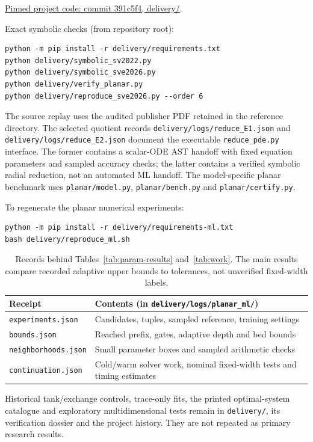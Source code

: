 \documentclass[12pt,a4paper,oneside]{report}
\numberwithin{equation}{chapter}
\theoremstyle{definition}
\theoremstyle{remark}\newtheorem{remark}[theorem]{Remark}
\DeclareRobustCommand{\code}[1]{\nolinkurl{#1}}
\newif\ifreviewmarks
\DeclareRobustCommand{\review}[1]{{\ifreviewmarks\color{authorblue}\fi #1}}
\begin{document}
\noindent\href{https://github.com/CarlXerophilem/Lie-ML_PDES/tree/391c5f4d0e5ea3a5341aab414ac1944e8e46f0c4/delivery}{\review{Pinned project code: commit 391c5f4, delivery/}}.

\smallskip\noindent Exact symbolic checks (from repository root):
\begin{verbatim}
python -m pip install -r delivery/requirements.txt
python delivery/symbolic_sv2022.py
python delivery/symbolic_sve2026.py
python delivery/verify_planar.py
python delivery/reproduce_sve2026.py --order 6
\end{verbatim}
\review{The source replay uses the audited publisher PDF retained in the reference directory. The selected quotient records \code{delivery/logs/reduce_E1.json} and \code{delivery/logs/reduce_E2.json} document the executable \code{reduce_pde.py} interface. The former contains a scalar-ODE AST handoff with fixed equation parameters and sampled accuracy checks; the latter contains a verified symbolic radial reduction, not an automated ML handoff. The model-specific planar benchmark uses \code{planar/model.py}, \code{planar/bench.py} and \code{planar/certify.py}.}

\smallskip\noindent To regenerate the planar numerical experiments:
\begin{verbatim}
python -m pip install -r delivery/requirements-ml.txt
bash delivery/reproduce_ml.sh
\end{verbatim}
\begin{table}[!ht]\centering\small
\begin{tabularx}{\linewidth}{@{}p{.32\linewidth}X@{}}\toprule
Receipt & Contents (in \code{delivery/logs/planar_ml/})\\\midrule
\code{experiments.json} & Candidates, tuples, sampled reference, training settings\\
\code{bounds.json} & Reached prefix, gates, adaptive depth and bed bounds\\
\code{neighborhoods.json} & Small parameter boxes and sampled arithmetic checks\\
\code{continuation.json} & Cold/warm solver work, nominal fixed-width tests and timing estimates\\\bottomrule
\end{tabularx}
\caption[Recorded computational evidence]{\review{Records behind Tables~\ref{tab:param-results} and~\ref{tab:work}. The main results compare recorded adaptive upper bounds to tolerances, not unverified fixed-width labels.}}
\end{table}
\review{Historical tank/exchange controls, trace-only fits, the printed optimal-system catalogue and exploratory multidimensional tests remain in \code{delivery/}, its verification dossier and the project history. They are not repeated as primary research results.}
\end{document}
